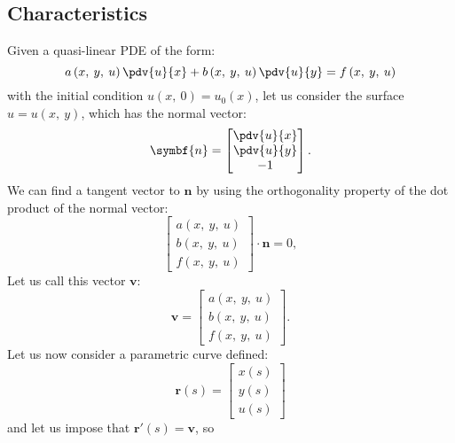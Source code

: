 \documentclass{article}
\theoremstyle{definition}
\begin{document}
\subsection{Characteristics}
Given a quasi-linear PDE of the form:
\begin{equation*}
    a\left( x,\: y,\: u \right) \pdv{u}{x} + b\left( x,\: y,\: u \right) \pdv{u}{y} = f\left( x,\: y,\: u \right)
\end{equation*}
with the initial condition \(u\left( x,\: 0 \right) = u_0\left( x \right)\),
let us consider the surface \(u = u\left( x,\: y \right)\), which has
the normal vector:
\begin{equation*}
    \symbf{n} =
    \begin{bmatrix}
        \pdv{u}{x} \\
        \pdv{u}{y} \\
        -1
    \end{bmatrix}.
\end{equation*}
We can find a tangent vector to \(\symbf{n}\) by using the orthogonality
property of the dot product of the normal vector:
\begin{equation*}
    \begin{bmatrix}
        a\left( x,\: y,\: u \right) \\
        b\left( x,\: y,\: u \right) \\
        f\left( x,\: y,\: u \right)
    \end{bmatrix}
    \cdot
    \symbf{n}
    = 0,
\end{equation*}
Let us call this vector \(\symbf{v}\):
\begin{equation*}
    \symbf{v} =
    \begin{bmatrix}
        a\left( x,\: y,\: u \right) \\
        b\left( x,\: y,\: u \right) \\
        f\left( x,\: y,\: u \right)
    \end{bmatrix}.
\end{equation*}
Let us now consider a parametric curve defined:
\begin{equation*}
    \symbf{r}\left( s \right) = \begin{bmatrix}
        x\left( s \right) \\
        y\left( s \right) \\
        u\left( s \right)
    \end{bmatrix}
\end{equation*}
and let us impose that \(\symbf{r}'\left( s \right) = \symbf{v}\), so
\end{document}
